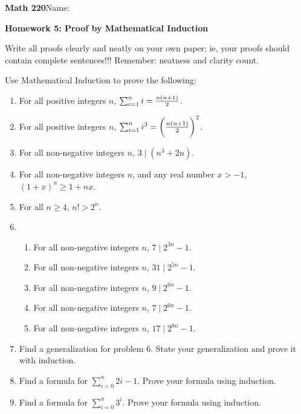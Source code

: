 \documentclass{article}
\begin{document}
{\bf Math 220}\hfill{Name:}

{\bf Homework 5: Proof by Mathematical Induction}
\vspace{.3in}

Write all proofs clearly and neatly on your own paper; ie, your proofs should contain complete sentences!!! Remember: neatness and clarity count.

Use Mathematical Induction to prove the following:

\begin{enumerate}
\item For all positive integers  $n$, $\sum_{i=1}^ni={n(n+1)\over 2}$.

\item For all positive integers  $n$, $\sum_{i=1}^ni^3=\biggl({n(n+1)\over 2}\biggr)^2$.

\item  For all non-negative integers $n$, $3\mid (n^3+2n)$.

\item For all non-negative integers $n$, and any real number $x>-1$, $(1+x)^n\geq 1+nx$.

\item For all $n\geq 4$, $n!>2^n$.
\item
\begin{enumerate}
\item For all non-negative integers $n$, $7\mid 2^{3n}-1$.
\item For all non-negative integers $n$, $31\mid 2^{5n}-1$.
\item For all non-negative integers $n$, $9\mid 2^{6n}-1$.
\item For all non-negative integers $n$, $7\mid 2^{6n}-1$.
\item For all non-negative integers $n$, $17\mid 2^{8n}-1$.

\end{enumerate}

\item Find a generalization for problem 6. State your generalization and prove it with induction.

\item Find a formula for $\sum_{i=0}^n 2i-1$. Prove your formula using induction.

\item Find a formula for $\sum_{i=0}^n 3^i$. Prove your formula using induction.

\end{enumerate}
\end{document}
